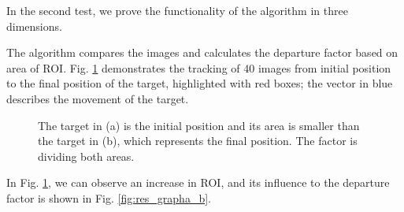 In the second test, we prove the functionality of the algorithm in three dimensions. 

The algorithm compares the images and calculates the departure factor 
based on area of ROI. Fig. \ref{fig:target} demonstrates the 
tracking of $40$ images from initial position to the final position of the target, 
highlighted with red boxes;
the vector in blue describes the movement of the target. 

\begin{figure}[H]
\centering
  \caption{The target in (a) is the initial position and its area is smaller than the target in (b), 
  which represents the final position. The factor is dividing both areas.}
  \label{fig:target}
\end{figure}

In Fig. \ref{fig:target}, we can observe an increase in ROI, and 
its influence to the departure factor is shown in Fig. \ref{fig:res_grapha_b}.

